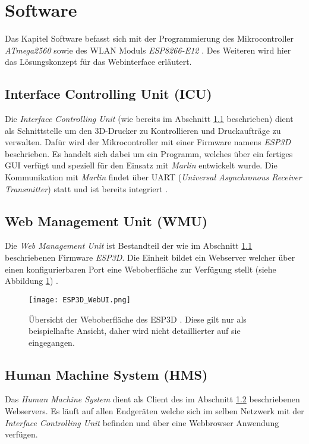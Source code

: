 \clearpage
\section{Software}\label{sec:Software}
Das Kapitel Software befasst sich mit der Programmierung des Mikrocontroller \textit{ATmega2560} \cite{ATmega2560_spezifiaktion} sowie des WLAN Moduls \textit{ESP8266-E12} \cite{ESP8266_spezifiaktion}. Des Weiteren wird hier das Lösungskonzept für das Webinterface erläutert.

\subsection{Interface Controlling Unit (ICU)}\label{subsec:ICU_SW}
Die \textit{Interface Controlling Unit} (wie bereits im Abschnitt \ref{subsec:ICU_SW} beschrieben) dient als Schnittstelle um den 3D-Drucker zu Kontrollieren und Druckaufträge zu verwalten. Dafür wird der Mikrocontroller mit einer Firmware namens \textit{ESP3D} beschrieben. Es handelt sich dabei um ein Programm, welches über ein fertiges GUI verfügt und speziell für den Einsatz mit \textit{Marlin} entwickelt wurde. Die Kommunikation mit \textit{Marlin} findet über UART (\textit{Universal Asynchronous Receiver Transmitter}) statt und ist bereits integriert \cite{ESP3D_git}.

\subsection{Web Management Unit (WMU)}\label{subsec:WMU}
Die \textit{Web Management Unit} ist Bestandteil der wie im Abschnitt \ref{subsec:ICU_SW} beschriebenen Firmware \textit{ESP3D}. Die Einheit bildet ein Webserver welcher über einen konfigurierbaren Port eine Weboberfläche zur Verfügung stellt (siehe Abbildung \ref{img:Weboberflaeche_ESP3D_Uebersicht}) \cite{ESP3D_git}.

\begin{figure}[h]
	\centering
	\texttt{[image: ESP3D\_WebUI.png]}
	\caption{Übersicht der Weboberfläche des ESP3D \cite{ESP3D_Web_UI}. Diese gilt nur als beispielhafte Ansicht, daher wird nicht detaillierter auf sie eingegangen.}
	\label{img:Weboberflaeche_ESP3D_Uebersicht}
\end{figure} 



\subsection{Human Machine System (HMS)}\label{subsec:HMS_SW}
Das \textit{Human Machine System} dient als Client des im Abschnitt \ref{subsec:WMU} beschriebenen Webservers. Es läuft auf allen Endgeräten welche sich im selben Netzwerk mit der \textit{Interface Controlling Unit} befinden und über eine Webbrowser Anwendung verfügen. 









